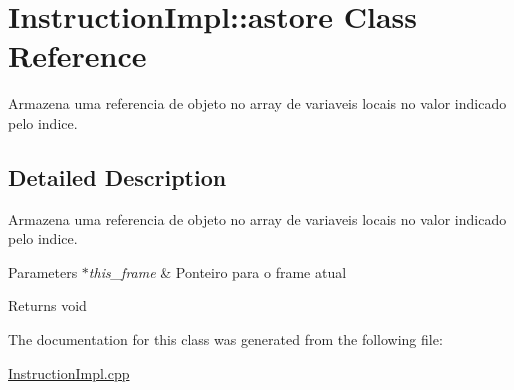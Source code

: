 \hypertarget{class_instruction_impl_1_1astore}{}\section{Instruction\+Impl\+:\+:astore Class Reference}
\label{class_instruction_impl_1_1astore}


Armazena uma referencia de objeto no array de variaveis locais no valor indicado pelo indice.  




\subsection{Detailed Description}
Armazena uma referencia de objeto no array de variaveis locais no valor indicado pelo indice. 


\begin{DoxyParams}{Parameters}
{\em $\ast$this\+\_\+frame} & Ponteiro para o frame atual \\
\hline
\end{DoxyParams}
\begin{DoxyReturn}{Returns}
void 
\end{DoxyReturn}


The documentation for this class was generated from the following file\+:\begin{DoxyCompactItemize}
\item 
\hyperlink{_instruction_impl_8cpp}{Instruction\+Impl.\+cpp}\end{DoxyCompactItemize}
